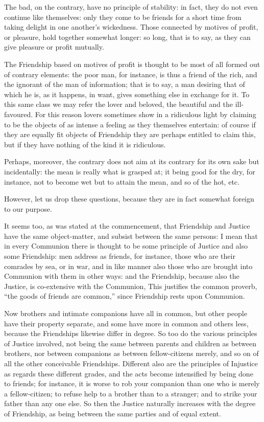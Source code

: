 The bad, on the contrary, have no principle of stability: in fact, they do not
even continue like themselves: only they come to be friends for a short time
from taking delight in one another’s wickedness. Those connected by
motives of profit, or pleasure, hold together somewhat longer: so long, that is
to say, as they can give pleasure or profit mutually.

The Friendship based on motives of profit is thought to be most of all formed
out of contrary elements: the poor man, for instance, is thus a friend of the
rich, and the ignorant of the man of information; that is to say, a man
desiring that of which he is, as it happens, in want, gives something else in
exchange for it. To this same class we may refer the lover and beloved, the
beautiful and the ill-favoured. For this reason lovers sometimes show in a
ridiculous light by claiming to be the objects of as intense a feeling as they
themselves entertain: of course if they are equally fit objects of Friendship
they are perhaps entitled to claim this, but if they have nothing of the kind
it is ridiculous.

Perhaps, moreover, the contrary does not aim at its contrary for its own sake
but incidentally: the mean is really what is grasped at; it being good for the
dry, for instance, not to become wet but to attain the mean, and so of the hot,
etc.

However, let us drop these questions, because they are in fact somewhat foreign
to our purpose.


It seems too, as was stated at the commencement, that Friendship and Justice
have the same object-matter, and subsist between the same persons: I mean that
in every Communion there is thought to be some principle of Justice and also
some Friendship: men address as friends, for instance, those who are their
comrades by sea, or in war, and in like manner also those who are brought into
Communion with them in other ways: and the Friendship, because also the
Justice, is co-extensive with the Communion, This justifies the common proverb,
“the goods of friends are common,” since Friendship rests upon
Communion.

Now brothers and intimate companions have all in common, but other people have
their property separate, and some have more in common and others less, because
the Friendships likewise differ in degree. So too do the various principles of
Justice involved, not being the same between parents and children as between
brothers, nor between companions as between fellow-citizens merely, and so on
of all the other conceivable Friendships. Different also are the principles of
Injustice as regards these different grades, and the acts become intensified by
being done to friends; for instance, it is worse to rob your companion than one
who is merely a fellow-citizen; to refuse help to a brother than to a stranger;
and to strike your father than any one else. So then the Justice naturally
increases with the degree of Friendship, as being between the same parties and
of equal extent.

